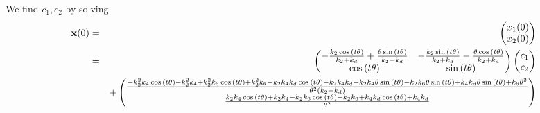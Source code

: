 \documentclass{bmcart}
\begin{document}
We find $c_1, c_2$ by solving
\begin{eqnarray*}
{\bf x} (0) & = & \begin{pmatrix} x_1 (0) \\ x_2 (0) \end{pmatrix} \\
& = & \begin{pmatrix}- \frac{k_{2} \cos{\left(t \theta \right)}}{k_{2} + k_{d}} + \frac{\theta \sin{\left(t \theta \right)}}{k_{2} + k_{d}} & - \frac{k_{2} \sin{\left(t \theta \right)}}{k_{2} + k_{d}} - \frac{\theta \cos{\left(t \theta \right)}}{k_{2} + k_{d}}\\\cos{\left(t \theta \right)} & \sin{\left(t \theta \right)}\end{pmatrix}  \begin{pmatrix} c_1 \\ c_2 \end{pmatrix} \\
&  & + \begin{pmatrix}\frac{- k_{2}^{2} k_{4} \cos{\left(t \theta \right)} - k_{2}^{2} k_{4} + k_{2}^{2} k_{6} \cos{\left(t \theta \right)} + k_{2}^{2} k_{6} - k_{2} k_{4} k_{d} \cos{\left(t \theta \right)} - k_{2} k_{4} k_{d} + k_{2} k_{4} \theta \sin{\left(t \theta \right)} - k_{2} k_{6} \theta \sin{\left(t \theta \right)} + k_{4} k_{d} \theta \sin{\left(t \theta \right)} + k_{6} \theta^{2}}{\theta^{2} \left(k_{2} + k_{d}\right)}\\\frac{k_{2} k_{4} \cos{\left(t \theta \right)} + k_{2} k_{4} - k_{2} k_{6} \cos{\left(t \theta \right)} - k_{2} k_{6} + k_{4} k_{d} \cos{\left(t \theta \right)} + k_{4} k_{d}}{\theta^{2}}\end{pmatrix}
\end{eqnarray*}
\end{document}
